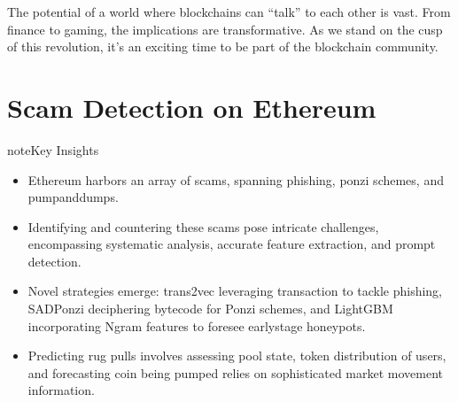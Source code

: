 \documentclass[letterpaper,10pt,english]{jupyterBook}
\begin{document}
\sphinxAtStartPar
The potential of a world where blockchains can “talk” to each other is vast. From finance to gaming, the implications are transformative. As we stand on the cusp of this revolution, it’s an exciting time to be part of the blockchain community.



\sphinxstepscope


\section{Scam Detection on Ethereum}
\label{\detokenize{SDE/ScamDetec:scam-detection-on-ethereum}}\label{\detokenize{SDE/ScamDetec::doc}}


\sphinxAtStartPar
{}



\begin{sphinxadmonition}{note}{Key Insights}
\begin{itemize}
\item {} 
\sphinxAtStartPar
Ethereum harbors an array of scams, spanning phishing, ponzi schemes, and pump\sphinxhyphen{}and\sphinxhyphen{}dumps.

\item {} 
\sphinxAtStartPar
Identifying and countering these scams pose intricate challenges, encompassing systematic analysis, accurate feature extraction, and prompt detection.

\item {} 
\sphinxAtStartPar
Novel strategies emerge: trans2vec leveraging transaction to tackle phishing, SADPonzi deciphering bytecode for Ponzi schemes, and LightGBM incorporating N\sphinxhyphen{}gram features to foresee early\sphinxhyphen{}stage honeypots.

\item {} 
\sphinxAtStartPar
Predicting rug pulls involves assessing pool state, token distribution of users, and forecasting coin being pumped relies on sophisticated market movement information.

\end{itemize}
\end{sphinxadmonition}
\end{document}

